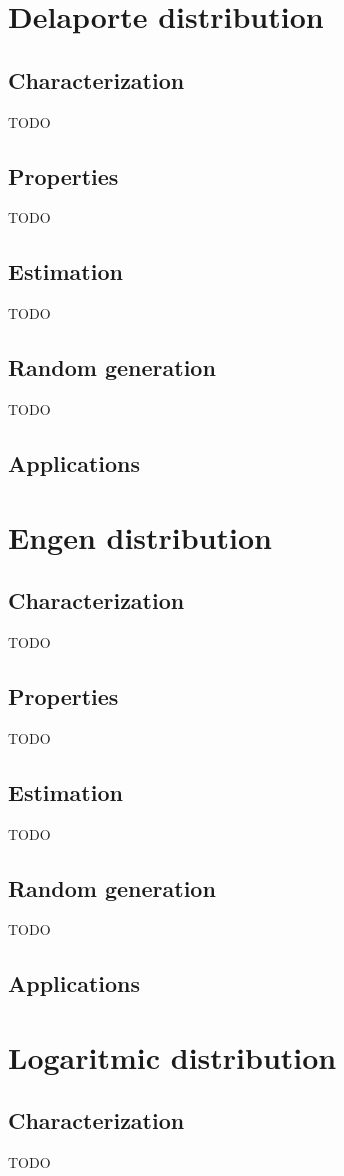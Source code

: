 \section{Delaporte distribution}
\subsection{Characterization}
TODO
\subsection{Properties}
TODO
\subsection{Estimation}
TODO
\subsection{Random generation}
TODO
\subsection{Applications}

\section{Engen distribution}
\subsection{Characterization}
TODO
\subsection{Properties}
TODO
\subsection{Estimation}
TODO
\subsection{Random generation}
TODO
\subsection{Applications}


\section{Logaritmic distribution}
\subsection{Characterization}
TODO

